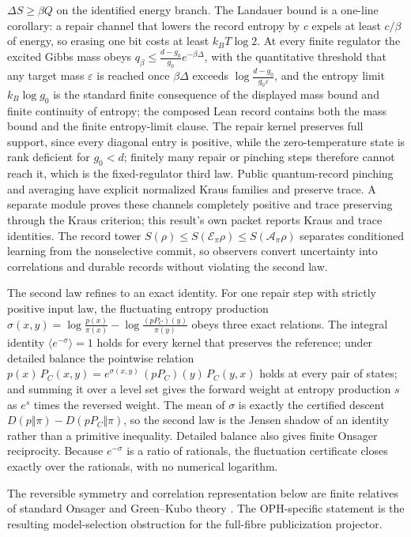 \documentclass[11pt]{article}
\begin{document}
\(\Delta S\ge\beta Q\) on the identified energy branch. The
Landauer bound is a one-line corollary: a repair channel that lowers
the record entropy by \(c\) expels at least \(c/\beta\) of energy,
so erasing one bit costs at least \(k_BT\log 2\).
At every finite regulator the excited Gibbs mass obeys
\(q_\beta\le\frac{d-g_0}{g_0}e^{-\beta\Delta}\), with the
quantitative threshold that any target mass \(\varepsilon\) is reached
once \(\beta\Delta\) exceeds \(\log\frac{d-g_0}{g_0\varepsilon}\),
and the entropy limit \(k_B\log g_0\) is the standard finite consequence of
the displayed mass bound and finite continuity of entropy; the
composed Lean record contains both the mass bound and the finite
entropy-limit clause. The repair kernel preserves
full support, since every diagonal entry is positive, while the
zero-temperature state is rank deficient for \(g_0<d\); finitely many
repair or pinching steps therefore cannot reach it, which is the
fixed-regulator third law. Public quantum-record pinching and averaging have
explicit normalized Kraus families and preserve trace. A separate module
proves these channels completely positive and trace preserving through the
Kraus criterion; this result's own packet reports Kraus and trace identities. The record tower
\(S(\rho)\le S(\mathcal E_\pi\rho)\le S(\mathcal A_\pi\rho)\)
separates conditioned learning from the nonselective commit, so
observers convert uncertainty into correlations and durable records
without violating the second law.

The second law refines to an exact identity. For one repair step with
strictly positive input law, the fluctuating entropy production
\(\sigma(x,y)=\log\frac{p(x)}{\pi(x)}-\log\frac{(pP_C)(y)}{\pi(y)}\)
obeys three exact relations. The integral identity
\(\langle e^{-\sigma}\rangle=1\) holds for every kernel that preserves
the reference; under detailed balance the pointwise relation
\(p(x)\,P_C(x,y)=e^{\sigma(x,y)}\,(pP_C)(y)\,P_C(y,x)\) holds at every
pair of states; and summing it over a level set gives the forward
weight at entropy production \(s\) as \(e^{s}\) times the reversed
weight. The mean of \(\sigma\) is exactly the certified descent
\(D(p\Vert\pi)-D(pP_C\Vert\pi)\), so the second law is the Jensen
shadow of an identity rather than a primitive inequality. Detailed
balance also gives finite Onsager reciprocity. Because \(e^{-\sigma}\)
is a ratio of rationals, the fluctuation certificate closes exactly over
the rationals, with no numerical logarithm.

The reversible symmetry and correlation representation below are finite
relatives of standard Onsager and Green--Kubo theory
\cite{onsager1931,greenKubo}. The OPH-specific statement is the resulting
model-selection obstruction for the full-fibre publicization projector.
\end{document}

